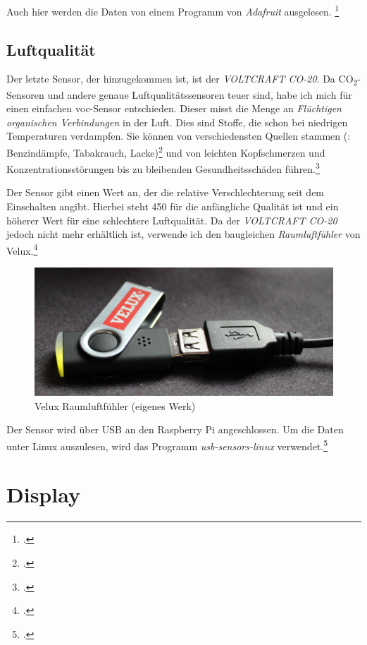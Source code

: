 Auch hier werden die Daten von einem Programm von \emph{Adafruit} ausgelesen. \footcite[Using the Adafruit BMP Python Library (Updated)]{bmp058_adafruit}

\subsection{Luftqualität}
\label{subsec:Luftqualitat}
Der letzte Sensor, der hinzugekommen ist, ist der \emph{VOLTCRAFT CO-20}. Da CO\textsubscript{2}-Sensoren und andere genaue Luftqualitätssensoren teuer sind, habe ich mich für einen einfachen \acrshort{voc}-Sensor entschieden. Dieser misst die Menge an \emph{Flüchtigen organischen Verbindungen} in der Luft. Dies sind Stoffe, die schon bei niedrigen Temperaturen verdampfen. Sie können von verschiedensten Quellen stammen (\zB: Benzindämpfe, Tabakrauch, Lacke)\footcite[41\psqq]{innenraum} und von leichten Kopfschmerzen und Konzentrationsstörungen bis zu bleibenden Gesundheitsschäden führen.\footcite[Gesundheitliche Wirkung]{VOC}

Der Sensor gibt einen Wert an, der die relative Verschlechterung seit dem Einschalten angibt. Hierbei steht 450 für die anfängliche Qualität ist und ein höherer Wert für eine schlechtere Luftqualität.
Da der \emph{VOLTCRAFT CO-20} jedoch nicht mehr erhältlich ist, verwende ich den baugleichen \emph{Raumluftfühler} von Velux.\footcite{Velux}

\begin{figure}[h]
  \centering
     \includegraphics[width=\textwidth]{figures/velux.jpg}
  \caption{Velux Raumluftfühler (eigenes Werk)}
  \label{fig:velux}
\end{figure}

Der Sensor wird über USB an den Raspberry Pi angeschlossen. Um die Daten unter Linux auszulesen, wird das Programm \emph{usb-sensors-linux} verwendet.\footcite{usb-sensors-linux}

\section{Display}
\label{sec:Display}

